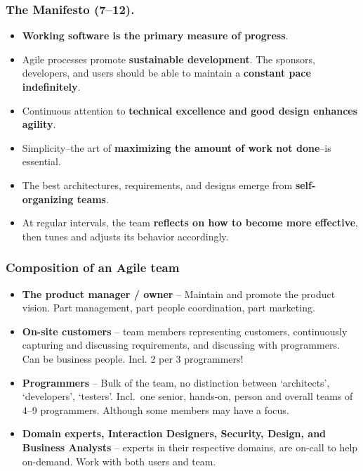 \documentclass{beamer} %
\newcommand\emc[1]{\textcolor{midred}{\textbf{#1}}}
\begin{document}
\begin{frame}
\frametitle{The Manifesto (7--12).}

\begin{itemize}


\item \emc{Working software is the primary measure of progress}.

\item Agile processes promote \emc{sustainable development}. 
The sponsors, developers, and users should be able 
to maintain a \emc{constant pace indefinitely}.

\item Continuous attention to \emc{technical excellence 
and good design enhances agility}.

\item Simplicity--the art of \emc{maximizing the amount 
of work not done}--is essential.

\item The best architectures, requirements, and designs 
emerge from \emc{self-organizing teams}.

\item At regular intervals, the team \emc{reflects on how 
to become more effective}, then tunes and adjusts 
its behavior accordingly.

\end{itemize}

\end{frame}


\begin{frame}

\frametitle{Composition of an Agile team}

\begin{itemize}
\item \emc{The product manager / owner} -- Maintain and promote the product vision. Part management, part people coordination, part marketing.

\item \emc{On-site customers} -- team members representing customers, continuously capturing and discussing requirements, and discussing with programmers. \\ Can be business people. Incl. 2 per 3 programmers!

\item \emc{Programmers} -- Bulk of the team, no distinction between `architects', `developers', `testers'. Incl.\ one senior, hands-on, person and overall teams of 4--9 programmers. Although some members may have a focus.

\item \emc{Domain experts, Interaction Designers, Security, Design, and Business Analysts} -- experts in their respective domains, are on-call to help on-demand. Work with both users and team.

\end{itemize}

\end{frame}
\end{document}
